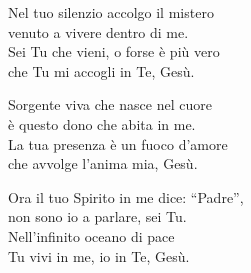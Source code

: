 
\strofa Nel tuo silenzio accolgo il mistero\\
venuto a vivere dentro di me.\\
Sei Tu che vieni, o forse è più vero\\
che Tu mi accogli in Te, Gesù.

\spazio

\strofa Sorgente viva che nasce nel cuore\\
è questo dono che abita in me.\\
La tua presenza è un fuoco d'amore\\
che avvolge l'anima mia, Gesù.

\spazio

\strofa Ora il tuo Spirito in me dice: ``Padre'',\\
non sono io a parlare, sei Tu.\\
Nell'infinito oceano di pace\\
Tu vivi in me, io in Te, Gesù.